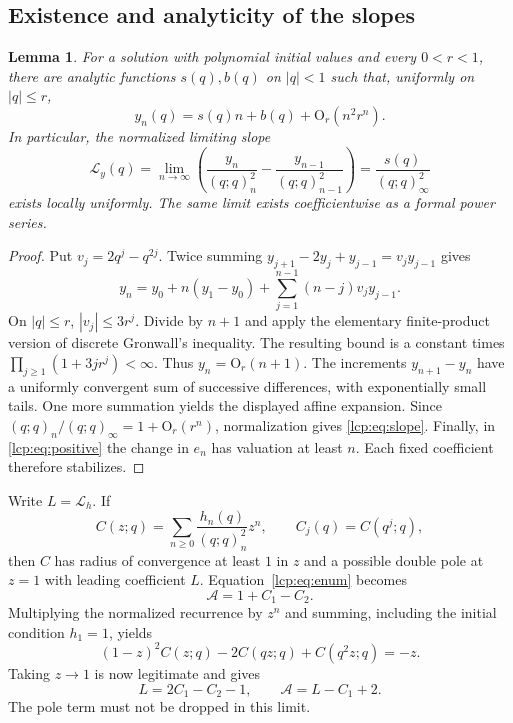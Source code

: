 \documentclass[11pt]{article}
\numberwithin{equation}{section}
\newtheorem{lemma}[theorem]{Lemma}
\theoremstyle{definition}\newtheorem{definition}[theorem]{Definition}
\theoremstyle{remark}\newtheorem{remark}[theorem]{Remark}
\newcommand{\OO}{\mathrm O}
\newcommand{\pp}[1]{(q;q)_{#1}}
\newcommand{\Acal}{\mathcal A}
\newcommand{\Lcal}{\mathcal L}
\begin{document}
\subsection{Existence and analyticity of the slopes}
\begin{lemma}\label{lcp:lem:slope}
For a solution with polynomial initial values and every $0<r<1$, there
are analytic functions $s(q),b(q)$ on $|q|<1$ such that, uniformly on
$|q|\le r$,
\[
 y_n(q)=s(q)n+b(q)+\OO_r(n^2r^n).
\]
In particular, the normalized limiting slope
\begin{equation}\label{lcp:eq:slope}
 \Lcal_y(q)=\lim_{n\to\infty}
 \left(\frac{y_n}{\pp n^2}-\frac{y_{n-1}}{\pp{n-1}^2}\right)
 =\frac{s(q)}{\pp\infty^2}
\end{equation}
exists locally uniformly. The same limit exists coefficientwise as a
formal power series.
\end{lemma}
\begin{proof}
Put $v_j=2q^j-q^{2j}$. Twice summing
$y_{j+1}-2y_j+y_{j-1}=v_jy_{j-1}$ gives
\[
 y_n=y_0+n(y_1-y_0)+\sum_{j=1}^{n-1}(n-j)v_jy_{j-1}.
\]
On $|q|\le r$, $|v_j|\le3r^j$. Divide by $n+1$ and apply the elementary
finite-product version of discrete Gronwall's inequality. The resulting
bound is a constant times $\prod_{j\ge1}(1+3jr^j)<\infty$.
Thus $y_n=\OO_r(n+1)$. The increments $y_{n+1}-y_n$ have a uniformly
convergent sum of successive differences, with exponentially small tails.
One more summation yields the displayed affine expansion.
Since $\pp n/\pp\infty=1+\OO_r(r^n)$, normalization gives
\eqref{lcp:eq:slope}. Finally, in \eqref{lcp:eq:positive} the change in $e_n$
has valuation at least $n$. Each fixed coefficient therefore stabilizes.
\end{proof}

Write $L=\Lcal_h$. If
\begin{equation}\label{lcp:eq:C}
 C(z;q)=\sum_{n\ge0}\frac{h_n(q)}{\pp n^2}z^n,
 \qquad C_j(q)=C(q^j;q),
\end{equation}
then $C$ has radius of convergence at least $1$ in $z$ and a possible
double pole at $z=1$ with leading coefficient $L$.
Equation~\eqref{lcp:eq:enum} becomes
\begin{equation}\label{lcp:eq:AC}
 \Acal=1+C_1-C_2.
\end{equation}
Multiplying the normalized recurrence by $z^n$ and summing, including the
initial condition $h_1=1$, yields
\begin{equation}\label{lcp:eq:Cdiff}
 (1-z)^2C(z;q)-2C(qz;q)+C(q^2z;q)=-z.
\end{equation}
Taking $z\to1$ is now legitimate and gives
\begin{equation}\label{lcp:eq:Lidentity}
 L=2C_1-C_2-1,\qquad \Acal=L-C_1+2.
\end{equation}
The pole term must not be dropped in this limit.
\end{document}
